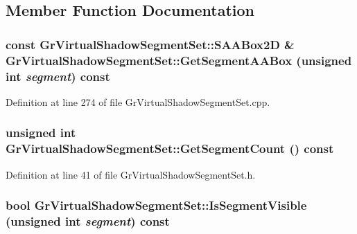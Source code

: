 \subsection{Member Function Documentation}
\hypertarget{class_gr_virtual_shadow_segment_set_25b9adc6e79330f077e34c834521a16d}{
\subsubsection[{GetSegmentAABox}]{\setlength{\rightskip}{0pt plus 5cm}const {\bf GrVirtualShadowSegmentSet::SAABox2D} \& GrVirtualShadowSegmentSet::GetSegmentAABox (unsigned int {\em segment}) const}}
\label{class_gr_virtual_shadow_segment_set_25b9adc6e79330f077e34c834521a16d}




Definition at line 274 of file GrVirtualShadowSegmentSet.cpp.\hypertarget{class_gr_virtual_shadow_segment_set_2289656379ca28ba3c9927dde5e5db39}{
\subsubsection[{GetSegmentCount}]{\setlength{\rightskip}{0pt plus 5cm}unsigned int GrVirtualShadowSegmentSet::GetSegmentCount () const}}
\label{class_gr_virtual_shadow_segment_set_2289656379ca28ba3c9927dde5e5db39}




Definition at line 41 of file GrVirtualShadowSegmentSet.h.\hypertarget{class_gr_virtual_shadow_segment_set_2ba9048945a0a60bb9cb59f3e8796887}{
\subsubsection[{IsSegmentVisible}]{\setlength{\rightskip}{0pt plus 5cm}bool GrVirtualShadowSegmentSet::IsSegmentVisible (unsigned int {\em segment}) const}}
\label{class_gr_virtual_shadow_segment_set_2ba9048945a0a60bb9cb59f3e8796887}




